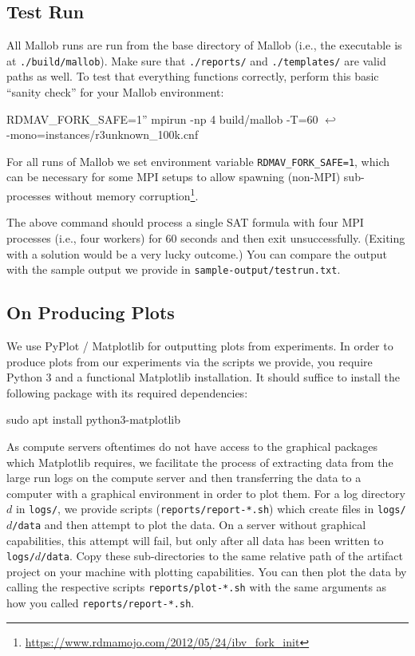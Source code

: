 \documentclass[runningheads]{article}
\newcommand{\CR}{{\tiny$\hookleftarrow$}}
\numberwithin{dummy}{subsection}
\begin{document}
\subsection{Test Run}

All Mallob runs are run from the base directory of Mallob (i.e., the executable is at \texttt{./build/mallob}).
Make sure that \texttt{./reports/} and \texttt{./templates/} are valid paths as well.
To test that everything functions correctly, perform this basic ``sanity check'' for your Mallob environment:

\begin{ttfenv}
RDMAV\_FORK\_SAFE=1'' mpirun -np 4 build/mallob -T=60 \CR\\
\hspace*{0.3cm}-mono=instances/r3unknown\_100k.cnf
\end{ttfenv}

For all runs of Mallob we set environment variable \texttt{RDMAV\_FORK\_SAFE=1}, which can be necessary for some MPI setups to allow spawning (non-MPI) sub-processes without memory corruption\footnote{\url{https://www.rdmamojo.com/2012/05/24/ibv_fork_init}}.

The above command should process a single SAT formula with four MPI processes (i.e., four workers) for 60 seconds and then exit unsuccessfully. (Exiting with a solution would be a very lucky outcome.)
You can compare the output with the sample output we provide in \texttt{sample-output/testrun.txt}.

\subsection{On Producing Plots}
\label{sec:plots}

We use PyPlot / Matplotlib for outputting plots from experiments.
In order to produce plots from our experiments via the scripts we provide, you require Python 3 and a functional Matplotlib installation.
It should suffice to install the following package with its required dependencies:

\begin{ttfenv}
sudo apt install python3-matplotlib
\end{ttfenv}

As compute servers oftentimes do not have access to the graphical packages which Matplotlib requires, we facilitate the process of extracting data from the large run logs on the compute server and then transferring the data to a computer with a graphical environment in order to plot them.
For a log directory $d$ in \texttt{logs/}, we provide scripts (\texttt{reports/report-*.sh}) which create files in \texttt{logs/$d$/data} and then attempt to plot the data.
On a server without graphical capabilities, this attempt will fail, but only after all data has been written to \texttt{logs/$d$/data}.
Copy these sub-directories to the same relative path of the artifact project on your machine with plotting capabilities.
You can then plot the data by calling the respective scripts \texttt{reports/plot-*.sh} with the same arguments as how you called \texttt{reports/report-*.sh}.
\end{document}
